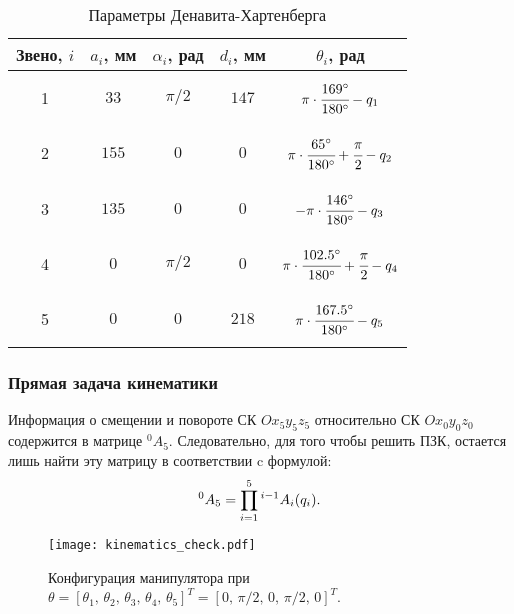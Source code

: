 \begin{table}[h!]
	\caption{Параметры Денавита-Хартенберга}
	\begin{center}
		\begin{tabular}{|c|c|c|c|c|}
			\hline
			Звено, $i$ 	& $a_i$, мм & $\alpha_i$, рад & $d_i$, мм & $\theta_i$, рад\\
			\hline
			1  		& $33$ & $\pi/2$ & $147$ & \parbox[c][0.7\height]{4cm}{$$\pi \cdot \cfrac{169^\circ}{180^\circ} - q_1$$}\\
			 		& $155$ & $0$ 	& $0$ & \parbox[c][0.7\height]{4cm}{$$\pi \cdot \cfrac{65^\circ}{180^\circ} + \cfrac{\pi}{2} - q_2$$}\\
			 		& $135$ & $0$ 	& $0$ 	& \parbox[c][0.7\height]{4cm}{$$-\pi \cdot \cfrac{146^\circ}{180^\circ} - q_3$$}\\
			 	& $0$ & $\pi/2$ & $0$ & \parbox[c][0.7\height]{4cm}{$$\pi \cdot \cfrac{102.5^\circ}{180^\circ} + \cfrac{\pi}{2} - q_4$$}\\
			 		& $0$ & $0$ 	& $218$     & \parbox[c][0.7\height]{4cm}{$$\pi \cdot \cfrac{167.5^\circ}{180^\circ} - q_5$$}\\
			\hline
		\end{tabular}
	\end{center}
	\label{table_DH_params}
\end{table}


\subsubsection{Прямая задача кинематики}\label{part_kinematics_forward}
Информация о смещении и повороте СК $Ox_5y_5z_5$ относительно СК $Ox_0y_0z_0$ содержится в матрице ${}^0A_5$.
Следовательно, для того чтобы решить ПЗК, остается лишь найти эту матрицу в соответствии c формулой:
\begin{equation}\label{fk}
	{}^0A_5 = \prod^{5}_{i=1}{{}^{i-1}A_i(q_i)}\ldotp
\end{equation}

\begin{figure}[h]
	\centering
	\texttt{[image: kinematics\_check.pdf]}
	\caption{Конфигурация манипулятора при $\theta=\left[\theta_1,\,\theta_2,\,\theta_3,\,\theta_4,\,\theta_5\right]^T = \left[0,\,\pi/2,\,0,\,\pi/2,\,0\right]^T$.}
	\label{kinematics_check}
\end{figure}

